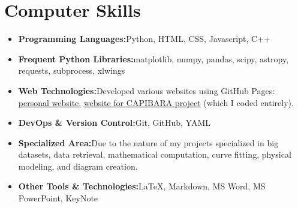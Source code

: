 \documentclass[a4paper,11pt]{article}
\newcommand{\resumeItem}[2]{
  \item{
    \textbf{#1}{\hspace{0.5mm}#2 \vspace{-0.5mm}}
  }
}
\newcommand{\resumeSubItem}[2]{\resumeItem{#1}{#2}\vspace{-4pt}}
\newcommand{\resumeHeadingSkillStart}{\begin{itemize}[leftmargin=*,itemsep=1.7mm, rightmargin=2ex]}
\newcommand{\resumeHeadingSkillEnd}{\end{itemize}\vspace{-2mm}}
\begin{document}
{%








\section{\textbf{Computer Skills}}
 \resumeHeadingSkillStart
  \resumeSubItem{Programming Languages:}
    {Python, HTML, CSS, Javascript, C++}
  \resumeSubItem{Frequent Python Libraries:}
    {matplotlib, numpy, pandas, scipy, astropy, requests, subprocess, xlwings}
  \resumeSubItem{Web Technologies:}
    {Developed various websites using GitHub Pages: \href{https://joanalnu.github.io}{personal website}, \href{https://capibara3.github.io}{website for CAPIBARA project} (which I coded entirely).}
  \resumeSubItem{DevOps \& Version Control:}
    {Git, GitHub, YAML}
  \resumeSubItem{Specialized Area:}
    {Due to the nature of my projects specialized in big datasets, data retrieval, mathematical computation, curve fitting, physical modeling, and diagram creation.}
  \resumeSubItem{Other Tools \& Technologies:}
    {\LaTeX, Markdown, MS Word, MS PowerPoint, KeyNote}
 \resumeHeadingSkillEnd

}
\end{document}
